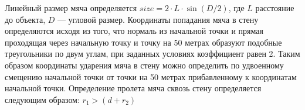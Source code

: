 \solutionSection

Линейный размер мяча определяется $size = 2\cdot L\cdot \sin(D/2)$, где $L$ расстояние до объекта, $D$ — угловой размер. Координаты попадания мяча в стену определяются исходя из того, что нормаль из начальной точки и прямая проходящая через начальную точку и точку на 50 метрах образуют подобные треугольники по двум углам, при заданных условиях коэффициент равен 2. Таким образом координаты ударения мяча в стену можно определить по удвоенному смещению начальной точки от точки на 50 метрах прибавленному к координатам начальной точки. Определение пролета мяча сквозь стену определяется следующим образом: $r_1 > (d + r_2)$ 

\codeExample

